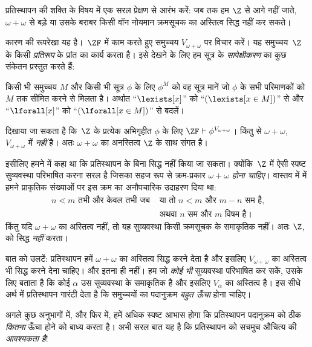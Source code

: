 \documentclass[../../../include/open-logic-section]{subfiles}
\begin{document}

प्रतिस्थापन की शक्ति के विषय में एक सरल प्रेक्षण से आरंभ करें: जब तक हम
$\Z$ से आगे नहीं जाते, $\omega + \omega$ से बड़े या उसके बराबर किसी वॉन
नोयमान क्रमसूचक का अस्तित्व सिद्ध नहीं कर सकते।

कारण की रूपरेखा यह है।~$\ZF$ में काम करते हुए समुच्चय
$V_{\omega+\omega}$ पर विचार करें। यह समुच्चय~$\Z$ के किसी \emph{प्रतिरूप}
के प्रांत का कार्य करता है। इसे देखने के लिए हम सूत्र के
\emph{सापेक्षीकरण} का कुछ संकेतन प्रस्तुत करते हैं:
\begin{defn}
	किसी भी समुच्चय $M$ और किसी भी सूत्र $\phi$ के लिए $\phi^M$ को वह सूत्र
	मानें जो $\phi$ के सभी परिमाणकों को $M$ तक सीमित करने से मिलता है। अर्थात
	``$\lexists[x]$'' को ``$(\lexists[x \in M])$'' से और
	``$\lforall[x]$'' को ``$(\lforall[x \in M])$'' से बदलें।
\end{defn}\noindent
दिखाया जा सकता है कि~$\Z$ के प्रत्येक अभिगृहीत $\phi$ के लिए
$\ZF \vdash \phi^{V_{\omega+\omega}}$। किंतु
 से $\omega+\omega$,
$V_{\omega+\omega}$ में \emph{नहीं} है। अतः $\omega+\omega$ का अनस्तित्व
$\Z$ के साथ संगत है।

इसीलिए हमने  में कहा था कि प्रतिस्थापन के
बिना  सिद्ध नहीं किया जा
सकता। क्योंकि~$\Z$ में ऐसी स्पष्ट सुव्यवस्था परिभाषित करना सरल है जिसका सहज
रूप से क्रम-प्रकार $\omega+\omega$ \emph{होना चाहिए}। वास्तव में
 में हमने प्राकृतिक संख्याओं पर इस क्रम का
अनौपचारिक उदाहरण दिया था:
\begin{align*}
	n \lessdot m \text{ तभी और केवल तभी जब }&\text{या तो }n < m\text{ और }m-n\text{ सम है,}\\
	& \text{अथवा $n$ सम और $m$ विषम है।}
\end{align*}
किंतु यदि $\omega+\omega$ का अस्तित्व नहीं, तो यह सुव्यवस्था किसी क्रमसूचक
के समाकृतिक नहीं। अतः $\Z$,
 को सिद्ध \emph{नहीं}
करता।

बात को उलटें: प्रतिस्थापन हमें $\omega+\omega$ का अस्तित्व सिद्ध करने देता
है और इसलिए $V_{\omega+\omega}$ का अस्तित्व भी सिद्ध करने देना चाहिए। और
इतना ही नहीं। हम जो \emph{कोई भी} सुव्यवस्था परिभाषित कर सकें, उसके लिए
 बताता है कि कोई
$\alpha$ उस सुव्यवस्था के समाकृतिक है और इसलिए $V_\alpha$ का अस्तित्व है।
इस सीधे अर्थ में प्रतिस्थापन गारंटी देता है कि समुच्चयों का पदानुक्रम
\emph{बहुत ऊँचा} होना चाहिए।

अगले कुछ अनुभागों में, और फिर  में, हमें
अधिक स्पष्ट आभास होगा कि प्रतिस्थापन पदानुक्रम को ठीक \emph{कितना} ऊँचा
होने को बाध्य करता है। अभी सरल बात यह है कि प्रतिस्थापन को सचमुच औचित्य की
\emph{आवश्यकता है}!{}
\end{document}
